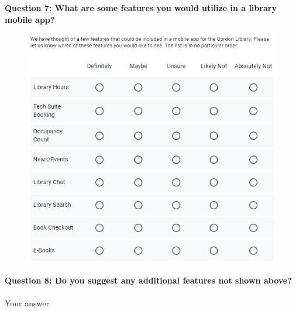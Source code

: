 \noindent\textbf{Question 7: What are some features you would utilize in a library mobile app?}
\begin{figure}[H]
    \centering
     \includegraphics[width = \textwidth, height = \textheight, keepaspectratio]{assets/img/Initial Survey Q7.jpg}
\end{figure}
\newline


\noindent\textbf{Question 8: Do you suggest any additional features not shown above?}
\paragraph{}
Your answer
\newline


